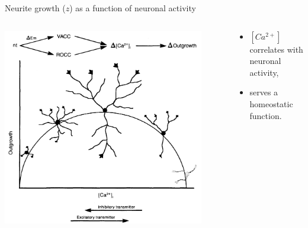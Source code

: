 \begin{frame}[t]{Neurite growth (\(z\)) as a function of neuronal activity}
  \vspace{0.4cm}
  \begin{columns}
    \begin{column}{0.5\textwidth}
      \centering
      \includegraphics[width=0.9\textwidth]{99_images/lipton1989.png}%
    \end{column}
    \pause{}
    \begin{column}{0.5\textwidth}
      \centering
      \begin{itemize}
        \item \([Ca^{2+}]\) correlates with neuronal activity,
        \item serves a homeostatic function.
      \end{itemize}
    \end{column}
  \end{columns}
\end{frame}
